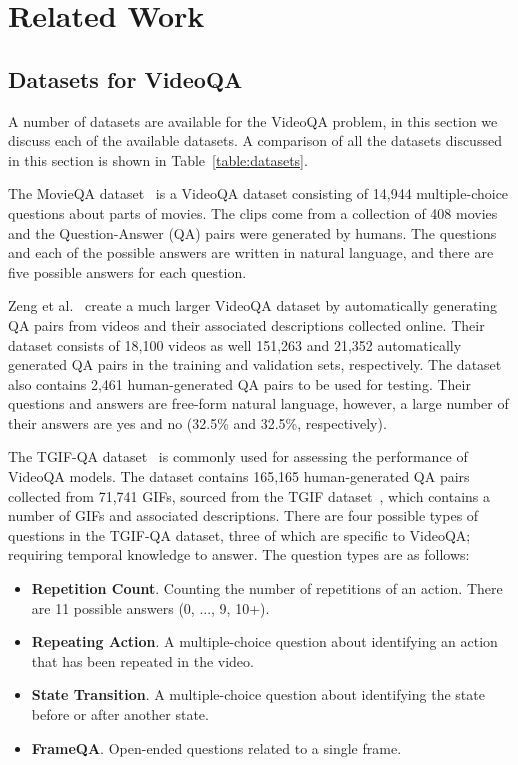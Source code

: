 \documentclass[../interim.tex]{subfiles}
\begin{document}
\chapter{Related Work} \label{chapter:related}

\section{Datasets for VideoQA}

A number of datasets are available for the VideoQA problem, in this section we discuss each of the available datasets. A comparison of all the datasets discussed in this section is shown in Table~\ref{table:datasets}.

The MovieQA dataset~\cite{dataset:movie-qa} is a VideoQA dataset consisting of 14,944 multiple-choice questions about parts of movies. The clips come from a collection of 408 movies and the Question-Answer (QA) pairs were generated by humans. The questions and each of the possible answers are written in natural language, and there are five possible answers for each question.

Zeng et al.~\cite{dataset:zeng} create a much larger VideoQA dataset by automatically generating QA pairs from videos and their associated descriptions collected online. Their dataset consists of 18,100 videos as well 151,263 and 21,352 automatically generated QA pairs in the training and validation sets, respectively. The dataset also contains 2,461 human-generated QA pairs to be used for testing. Their questions and answers are free-form natural language, however, a large number of their answers are yes and no (32.5\% and 32.5\%, respectively).

The TGIF-QA dataset~\cite{dataset:tgif-qa} is commonly used for assessing the performance of VideoQA models. The dataset contains 165,165 human-generated QA pairs collected from 71,741 GIFs, sourced from the TGIF dataset~\cite{dataset:tgif}, which contains a number of GIFs and associated descriptions. There are four possible types of questions in the TGIF-QA dataset, three of which are specific to VideoQA; requiring temporal knowledge to answer. The question types are as follows:
\begin{itemize}
  \item \textbf{Repetition Count}. Counting the number of repetitions of an action. There are 11 possible answers (0, ..., 9, 10+).

  \item \textbf{Repeating Action}. A multiple-choice question about identifying an action that has been repeated in the video.

  \item \textbf{State Transition}. A multiple-choice question about identifying the state before or after another state.

  \item \textbf{FrameQA}. Open-ended questions related to a single frame.
\end{itemize}
\end{document}

